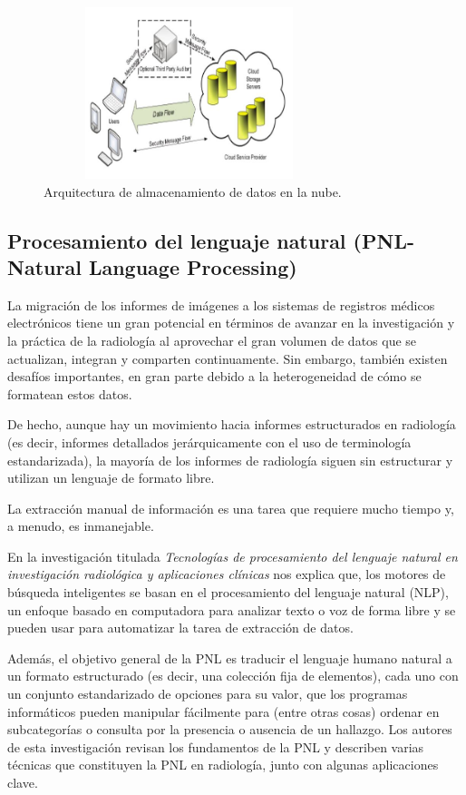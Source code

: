 \documentclass[10pt,journal]{IEEEtran}
\begin{document}
\begin{figure}[H]
 \begin{center}
       \includegraphics[width=8.5cm, height=5cm]{figuras/2.JPG}
      \caption{Arquitectura de almacenamiento de datos en la nube.}
      \label{f2} 
      \end{center}
\end{figure}

\subsection{\textbf{Procesamiento del lenguaje natural (PNL-Natural Language Processing)}}
La migración de los informes de imágenes a los sistemas de registros médicos electrónicos tiene un gran potencial en términos de avanzar en la investigación y la práctica de la radiología al aprovechar el gran volumen de datos que se actualizan, integran y comparten continuamente. Sin embargo, también existen desafíos importantes, en gran parte debido a la heterogeneidad de cómo se formatean estos datos.\par  De hecho, aunque hay un movimiento hacia informes estructurados en radiología (es decir, informes detallados jerárquicamente con el uso de terminología estandarizada), la mayoría de los informes de radiología siguen sin estructurar y utilizan un lenguaje de formato libre.\par La extracción manual de información es una tarea que requiere mucho tiempo y, a menudo, es inmanejable.\par
En la investigación titulada \textit{Tecnologías de procesamiento del lenguaje natural en investigación radiológica y aplicaciones clínicas} \citep{natural} nos explica que, los motores de búsqueda inteligentes se basan en el procesamiento del lenguaje natural (NLP), un enfoque basado en computadora para analizar texto o voz de forma libre y se pueden usar para automatizar la tarea de extracción de datos. \par Además, el objetivo general de la PNL es traducir el lenguaje humano natural a un formato estructurado (es decir, una colección fija de elementos), cada uno con un conjunto estandarizado de opciones para su valor, que los programas informáticos pueden manipular fácilmente para (entre otras cosas) ordenar en subcategorías o consulta por la presencia o ausencia de un hallazgo. Los autores de esta investigación revisan los fundamentos de la PNL y describen varias técnicas que constituyen la PNL en radiología, junto con algunas aplicaciones clave.
\end{document}
